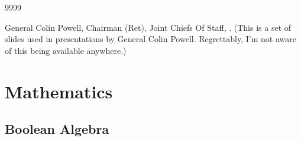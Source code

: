\begin{thecustombibliography}{9999}

General Colin Powell, Chairman (Ret), Joint Chiefs Of Staff,
.
(This is a set of slides used in presentations by General
Colin Powell.  Regrettably, I'm not aware of this being
available anywhere.)

\end{thecustombibliography}



\section*{Mathematics}



\subsection*{Boolean Algebra}

